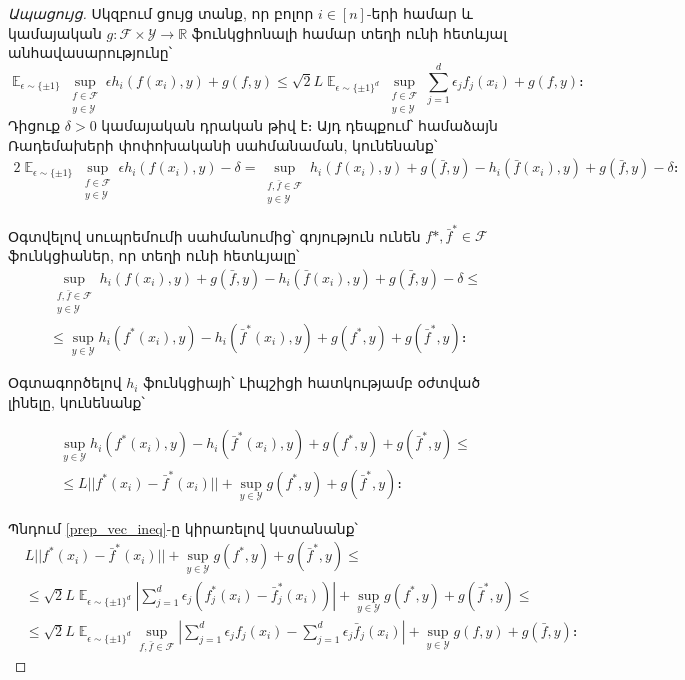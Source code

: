 \documentclass[12pt]{article}
\DeclareMathOperator*{\E}{\mathbb{E}}
\begin{document}
\begin{proof}[Ապացույց]
Սկզբում ցույց տանք, որ բոլոր $i \in [n]$-երի համար և կամայական $g:\mathcal{F}\times \mathcal{Y} \rightarrow \mathbb{R}$  ֆունկցիոնալի համար տեղի ունի հետևյալ անհավասարությունը՝
\begin{equation}
\label{sup_ineq}
\E_{\epsilon \sim \{\pm1\}}\sup_{\substack{f \in \mathcal{F} \\ y \in \mathcal{Y}}}    {\epsilon h_i(f(x_i), y)} + g(f, y)   \leq    \sqrt{2}L 
\E_{\epsilon \sim \{\pm1\}^d}\sup_{\substack{f \in \mathcal{F} \\ y \in \mathcal{Y}}}      {   \sum_{j=1}^d    \epsilon_jf_j(x_i)} + g(f, y)։
\end{equation}
Դիցուք $\delta > 0$ կամայական դրական թիվ է։ Այդ դեպքում՝ համաձայն Ռադեմախերի փոփոխականի սահմանաման, կունենանք՝
\begin{align*}
 2\E_{\epsilon \sim \{\pm1\}}\sup_{\substack{f \in \mathcal{F} \\ y \in \mathcal{Y}}}    {\epsilon h_i(f(x_i), y)} - \delta  
= \sup_{\substack{f, \bar{f} \in \mathcal{F}  \\ y \in \mathcal{Y}}}    {h_i(f(x_i), y)  + g(\bar{f}, y) - h_i(\bar{f}(x_i), y) + g(\bar{f}, y) - \delta}։
\end{align*}

Օգտվելով սուպրեմումի սահմանումից՝ գոյություն ունեն $f*, \bar{f}^* \in \mathcal{F}$ ֆունկցիաներ, որ տեղի ունի հետևյալը՝
\begin{align*}
 &\sup_{\substack{f, \bar{f} \in \mathcal{F}  \\ y \in \mathcal{Y}}}    {h_i(f(x_i), y)  + g(\bar{f}, y) - h_i(\bar{f}(x_i), y) + g(\bar{f}, y) -\delta}  \leq \\
 &\leq \sup_{y \in \mathcal{Y}}   h_i(f^*(x_i), y) - h_i(\bar{f}^*(x_i), y) + g(f^*, y) + g(\bar{f}^*, y)։
\end{align*}

Օգտագործելով $h_i$ ֆունկցիայի՝ Լիպշիցի հատկությամբ օժտված լինելը, կունենանք՝ 

\begin{align*}
 &\sup_{y \in \mathcal{Y}}   h_i(f^*(x_i), y) - h_i(\bar{f}^*(x_i), y) + g(f^*, y) + g(\bar{f}^*, y) \leq \\
& \leq   {L||f^*(x_i) - \bar{f}^*(x_i)||} + \sup_{y \in \mathcal{Y}}  g(f^*, y) + g(\bar{f}^*, y)։
\end{align*}

Պնդում \ref{prep_vec_ineq}-ը կիրառելով կստանանք՝
\begin{align*}
 &{L||f^*(x_i) - \bar{f}^*(x_i)||} + \sup_{y \in \mathcal{Y}}  g(f^*, y) + g(\bar{f}^*, y) \leq \\
& \leq  {\sqrt{2}L} \E_{\epsilon \sim \{\pm 1\}^d}    \left |  \sum_{j=1}^d \epsilon_j (f^*_j(x_i) - \bar{f}_j^*(x_i))  \right|                    + \sup_{y \in \mathcal{Y}}    g(f^*, y) + g(\bar{f}^*, y)  \leq \\
&\leq  {\sqrt{2}L} \E_{\epsilon \sim \{\pm 1\}^d}        \sup_{f, \bar{f} \in \mathcal{F}}      \left |  \sum_{j=1}^d \epsilon_j f_j(x_i) - \sum_{j=1}^d \epsilon_j\bar{f}_j(x_i)  \right|                    + \sup_{y \in \mathcal{Y}}    g(f, y) + g(\bar{f}, y) ։
\end{align*}


\end{proof}
\end{document}
